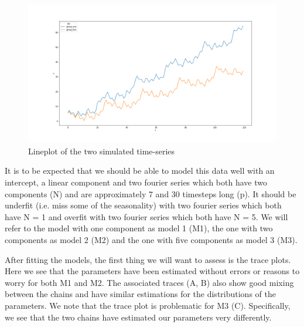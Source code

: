 \documentclass{article}
\begin{document}
\begin{figure}[H]
    \centerline{\includegraphics[scale = 0.45]{../plots/ex1_plot_data.png}}
    \caption{Lineplot of the two simulated time-series}
\end{figure}

It is to be expected that we should be able to model this data well with an intercept, a linear component and two fourier series which both have two components (N) and are approximately 7 and 30 timesteps long (p). It should be underfit (i.e. miss some of the seasonality) with two fourier series which both have N = 1 and overfit with two fourier series which both have N = 5. We will refer to the model with one component as model 1 (M1), the one with two components as model 2 (M2) and the one with five components as model 3 (M3).

After fitting the models, the first thing we will want to assess is the trace plots. Here we see that the parameters have been estimated without errors or reasons to worry for both M1 and M2. The associated traces (A, B) also show good mixing between the chains and have similar estimations for the distributions of the parameters. We note that the trace plot is problematic for M3 (C). Specifically, we see that the two chains have estimated our parameters very differently.
\end{document}
